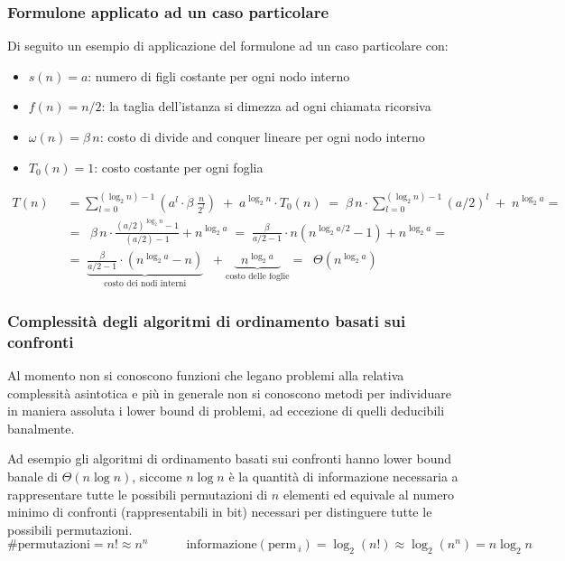 \subsubsection*{Formulone applicato ad un caso particolare}
Di seguito un esempio di applicazione del formulone ad un caso particolare con:
\begin{itemize}
	\item \(s(n) = a\): numero di figli costante per ogni nodo interno
	\item \(f(n) = n/2\): la taglia dell'istanza si dimezza ad ogni chiamata ricorsiva
	\item \(\omega(n) = \beta \, n\): costo di divide and conquer lineare per ogni nodo interno
	\item \(T_0(n) = 1\): costo costante per ogni foglia
\end{itemize}
\begin{align*}
	T(n) \;\; &= \sum_{l=0}^{(\log_2 n) - 1} \left( a^l \cdot \beta \; \frac{n}{2^l} \right) \; + \; a^{\log_2 n} \cdot T_0(n) \; = \; \beta \, n \cdot \! \sum_{l=0}^{(\log_2 n) - 1} \!\! \left( a/2 \right)^l \; + \; n^{\log_2 a} = \\[3pt]
	&= \;\; \beta \, n \cdot \frac{(a/2)^{\log_2 n} - 1}{(a/2) - 1} + n^{\log_2 a} \; = \; \frac{\beta}{a/2 - 1} \cdot n \left( n^{\log_2 a/2} - 1\right) + n^{\log_2 a} = \\[3pt]
	&= \; \underbrace{\frac{\beta}{a/2 - 1} \cdot (n^{\log_2 a} - n)}_{\text{costo dei nodi interni}} \;\; + \!\! \underbrace{ \;\; n^{\log_2 a} \;\;}_{\text{costo delle foglie}}
	\!\! = \;\; \Theta \left( n^{\log_2 a} \right)
\end{align*}

\subsubsection*{Complessità degli algoritmi di ordinamento basati sui confronti}
Al momento non si conoscono funzioni che legano problemi alla relativa complessità asintotica e più in generale non si
conoscono metodi per individuare in maniera assoluta i lower bound di problemi, ad eccezione di quelli deducibili banalmente.

Ad esempio gli algoritmi di ordinamento basati sui confronti hanno lower bound banale di \(\Theta(n \log n)\), siccome
\(n \log n\) è la quantità di informazione necessaria a rappresentare tutte le possibili permutazioni di \(n\) elementi ed
equivale al numero minimo di confronti (rappresentabili in bit) necessari per distinguere tutte le possibili permutazioni.
\[\# \text{permutazioni} = n! \approx n^n \qquad\quad \text{informazione}(\text{perm} \,_i) = \log_2(n!) \approx \log_2(n^n) = n \log_2 n\]



